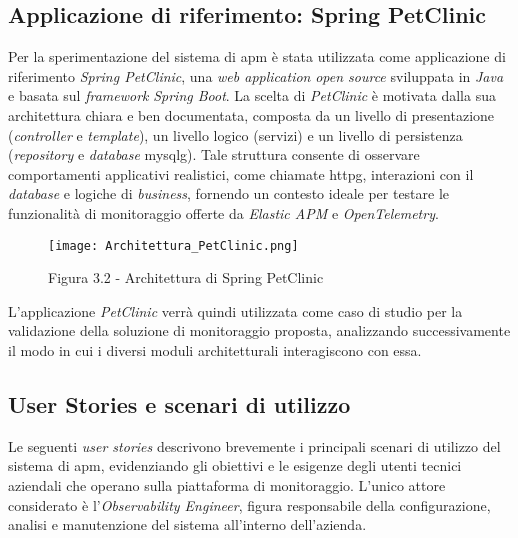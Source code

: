 \subsection{Applicazione di riferimento: Spring PetClinic}
Per la sperimentazione del sistema di \gls{apm} è stata utilizzata come applicazione di riferimento \emph{Spring PetClinic}, una \emph{web application} \emph{open source} sviluppata in \emph{Java} e basata sul \emph{framework} \emph{Spring Boot}.  
La scelta di \emph{PetClinic} è motivata dalla sua architettura chiara e ben documentata, composta da un livello di presentazione (\emph{controller} e \emph{template}), un livello logico (servizi) e un livello di persistenza (\emph{repository} e \emph{database} \gls{mysqlg}\glsfirstoccur).  
Tale struttura consente di osservare comportamenti applicativi realistici, come chiamate \gls{httpg}\glsfirstoccur, interazioni con il \emph{database} e logiche di \emph{business}, fornendo un contesto ideale per testare le funzionalità di monitoraggio offerte da \emph{Elastic APM} e \emph{OpenTelemetry}.  

\begin{figure}[!h] 
    \centering 
    \texttt{[image: Architettura\_PetClinic.png]} 
    \caption{Figura 3.2 - Architettura di Spring PetClinic}
\end{figure}


L'applicazione \emph{PetClinic} verrà quindi utilizzata come caso di studio per la validazione della soluzione di monitoraggio proposta, analizzando successivamente il modo in cui i diversi moduli architetturali interagiscono con essa.
\newpage

\subsection{User Stories e scenari di utilizzo}
Le seguenti \emph{user stories} descrivono brevemente i principali scenari di utilizzo del sistema di \gls{apm}, evidenziando gli obiettivi e le esigenze degli utenti tecnici aziendali che operano sulla piattaforma di monitoraggio.  
L'unico attore considerato è l'\emph{Observability Engineer}, figura responsabile della configurazione, analisi e manutenzione del sistema all'interno dell'azienda.


